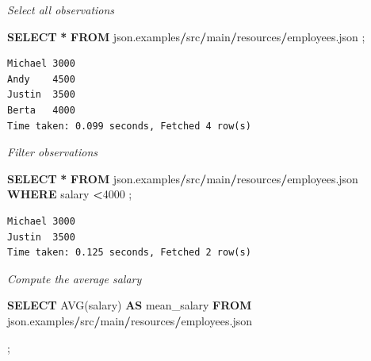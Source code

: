 \documentclass[
  12pt,
]{style/krantz}
\newenvironment{Shaded}{\begin{snugshade}}{\end{snugshade}}
\newcommand{\DecValTok}[1]{\textcolor[rgb]{0.00,0.00,0.81}{#1}}
\newcommand{\FunctionTok}[1]{\textcolor[rgb]{0.00,0.00,0.00}{#1}}
\newcommand{\KeywordTok}[1]{\textcolor[rgb]{0.13,0.29,0.53}{\textbf{#1}}}
\newcommand{\NormalTok}[1]{#1}
\newcommand{\OperatorTok}[1]{\textcolor[rgb]{0.81,0.36,0.00}{\textbf{#1}}}
\begin{document}
\emph{Select all observations}

\begin{Shaded}
\begin{Highlighting}[]

\KeywordTok{SELECT} \OperatorTok{*} 
\KeywordTok{FROM}\NormalTok{ json.\textasciigrave{}examples}\OperatorTok{/}\NormalTok{src}\OperatorTok{/}\NormalTok{main}\OperatorTok{/}\NormalTok{resources}\OperatorTok{/}\NormalTok{employees.json\textasciigrave{}}
\NormalTok{;}
\end{Highlighting}
\end{Shaded}

\begin{verbatim}
Michael 3000
Andy    4500
Justin  3500
Berta   4000
Time taken: 0.099 seconds, Fetched 4 row(s)
\end{verbatim}

\emph{Filter observations}

\begin{Shaded}
\begin{Highlighting}[]

\KeywordTok{SELECT} \OperatorTok{*} 
\KeywordTok{FROM}\NormalTok{ json.\textasciigrave{}examples}\OperatorTok{/}\NormalTok{src}\OperatorTok{/}\NormalTok{main}\OperatorTok{/}\NormalTok{resources}\OperatorTok{/}\NormalTok{employees.json\textasciigrave{}}
\KeywordTok{WHERE}\NormalTok{ salary }\OperatorTok{\textless{}}\DecValTok{4000}
\NormalTok{;}
\end{Highlighting}
\end{Shaded}

\begin{verbatim}
Michael 3000
Justin  3500
Time taken: 0.125 seconds, Fetched 2 row(s)
\end{verbatim}

\emph{Compute the average salary}

\begin{Shaded}
\begin{Highlighting}[]

\KeywordTok{SELECT} \FunctionTok{AVG}\NormalTok{(salary) }\KeywordTok{AS}\NormalTok{ mean\_salary }
\KeywordTok{FROM}\NormalTok{ json.\textasciigrave{}examples}\OperatorTok{/}\NormalTok{src}\OperatorTok{/}\NormalTok{main}\OperatorTok{/}\NormalTok{resources}\OperatorTok{/}\NormalTok{employees.json\textasciigrave{}}

\NormalTok{;}
\end{Highlighting}
\end{Shaded}
\end{document}
